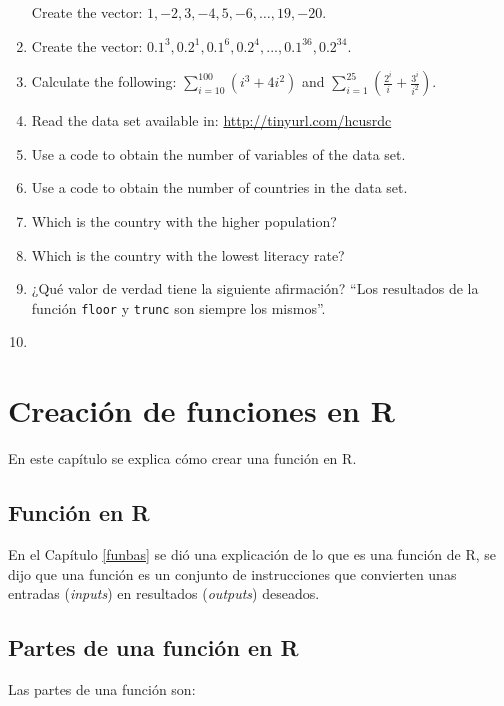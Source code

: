 \documentclass[10pt,]{krantz}
\let\proglang=\textsf
\begin{document}
\begin{enumerate}
  Create the vector: \(1, -2, 3, -4, 5, -6, \ldots, 19, -20\).
\item
  Create the vector:
  \(0.1^3, 0.2^1, 0.1^6, 0.2^4, . . . , 0.1^{36}, 0.2^{34}\).
\item
  Calculate the following: \(\sum_{i=10}^{100}(i^3+4i^2)\) and
  \(\sum_{i=1}^{25}\left( \frac{2^i}{i} + \frac{3^i}{i^2} \right)\).
\item
  Read the data set available in: \url{http://tinyurl.com/hcusrdc}
\item
  Use a code to obtain the number of variables of the data set.
\item
  Use a code to obtain the number of countries in the data set.
\item
  Which is the country with the higher population?
\item
  Which is the country with the lowest literacy rate?
\item
  ¿Qué valor de verdad tiene la siguiente afirmación? ``Los resultados
  de la función \texttt{floor} y \texttt{trunc} son siempre los
  mismos''.
\item
\end{enumerate}

\chapter{\texorpdfstring{Creación de funciones en
\proglang{R}}{Creación de funciones en }}\label{creacion-de-funciones-en}

En este capítulo se explica cómo crear una función en \proglang{R}.

\section{\texorpdfstring{Función en \proglang{R}
}{Función en  }}\label{funcion-en}

En el Capítulo \ref{funbas} se dió una explicación de lo que es una
función de \proglang{R}, se dijo que una función es un conjunto de
instrucciones que convierten unas entradas (\emph{inputs}) en resultados
(\emph{outputs}) deseados.

\section{\texorpdfstring{Partes de una función en \proglang{R}
}{Partes de una función en  }}\label{partes-de-una-funcion-en}

Las partes de una función son:
\end{document}
